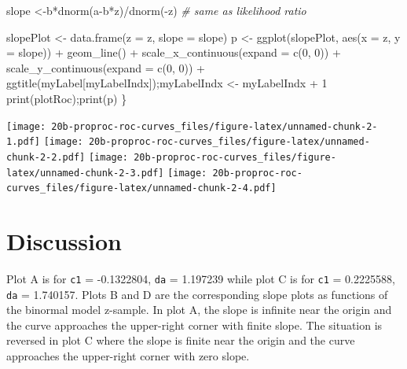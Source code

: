 \documentclass[
]{book}
\newenvironment{Shaded}{\begin{snugshade}}{\end{snugshade}}
\newcommand{\AttributeTok}[1]{\textcolor[rgb]{0.77,0.63,0.00}{#1}}
\newcommand{\CommentTok}[1]{\textcolor[rgb]{0.56,0.35,0.01}{\textit{#1}}}
\newcommand{\DecValTok}[1]{\textcolor[rgb]{0.00,0.00,0.81}{#1}}
\newcommand{\FunctionTok}[1]{\textcolor[rgb]{0.00,0.00,0.00}{#1}}
\newcommand{\NormalTok}[1]{#1}
\newcommand{\OtherTok}[1]{\textcolor[rgb]{0.56,0.35,0.01}{#1}}
\newcommand{\SpecialCharTok}[1]{\textcolor[rgb]{0.00,0.00,0.00}{#1}}
\begin{document}
\begin{Shaded}
\begin{Highlighting}[]
\NormalTok{  slope }\OtherTok{\textless{}{-}}\NormalTok{b}\SpecialCharTok{*}\FunctionTok{dnorm}\NormalTok{(a}\SpecialCharTok{{-}}\NormalTok{b}\SpecialCharTok{*}\NormalTok{z)}\SpecialCharTok{/}\FunctionTok{dnorm}\NormalTok{(}\SpecialCharTok{{-}}\NormalTok{z) }\CommentTok{\# same as likelihood ratio}
  
\NormalTok{  slopePlot }\OtherTok{\textless{}{-}} \FunctionTok{data.frame}\NormalTok{(}\AttributeTok{z =}\NormalTok{ z, }\AttributeTok{slope =}\NormalTok{ slope)}
\NormalTok{  p }\OtherTok{\textless{}{-}} \FunctionTok{ggplot}\NormalTok{(slopePlot, }\FunctionTok{aes}\NormalTok{(}\AttributeTok{x =}\NormalTok{ z, }\AttributeTok{y =}\NormalTok{ slope)) }\SpecialCharTok{+} 
    \FunctionTok{geom\_line}\NormalTok{()  }\SpecialCharTok{+} 
    \FunctionTok{scale\_x\_continuous}\NormalTok{(}\AttributeTok{expand =} \FunctionTok{c}\NormalTok{(}\DecValTok{0}\NormalTok{, }\DecValTok{0}\NormalTok{)) }\SpecialCharTok{+} 
    \FunctionTok{scale\_y\_continuous}\NormalTok{(}\AttributeTok{expand =} \FunctionTok{c}\NormalTok{(}\DecValTok{0}\NormalTok{, }\DecValTok{0}\NormalTok{))  }\SpecialCharTok{+}
    \FunctionTok{ggtitle}\NormalTok{(myLabel[myLabelIndx]);myLabelIndx }\OtherTok{\textless{}{-}}\NormalTok{ myLabelIndx }\SpecialCharTok{+} \DecValTok{1}
  \FunctionTok{print}\NormalTok{(plotRoc);}\FunctionTok{print}\NormalTok{(p)}
\NormalTok{\}}
\end{Highlighting}
\end{Shaded}

\texttt{[image: 20b-proproc-roc-curves\_files/figure-latex/unnamed-chunk-2-1.pdf]} \texttt{[image: 20b-proproc-roc-curves\_files/figure-latex/unnamed-chunk-2-2.pdf]} \texttt{[image: 20b-proproc-roc-curves\_files/figure-latex/unnamed-chunk-2-3.pdf]} \texttt{[image: 20b-proproc-roc-curves\_files/figure-latex/unnamed-chunk-2-4.pdf]}

\hypertarget{discussion}{%
\section{Discussion}\label{discussion}}

Plot A is for \texttt{c1} = -0.1322804, \texttt{da} = 1.197239 while plot C is for \texttt{c1} = 0.2225588, \texttt{da} = 1.740157. Plots B and D are the corresponding slope plots as functions of the binormal model z-sample. In plot A, the slope is infinite near the origin and the curve approaches the upper-right corner with finite slope. The situation is reversed in plot C where the slope is finite near the origin and the curve approaches the upper-right corner with zero slope.
\end{document}

